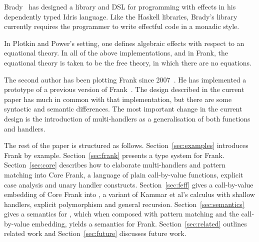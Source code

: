 Brady~\cite{Brady13} has designed a library and DSL for programming
with effects in his dependently typed Idris language. Like the Haskell
libraries, Brady's library currently requires the programmer to write
effectful code in a monadic style.

In Plotkin and Power’s setting, one defines algebraic effects with
respect to an equational theory. In all of the above implementations,
and in Frank, the equational theory is taken to be the free theory, in
which there are no equations.
%

The second author has been plotting Frank since
2007~\cite{McBride07}. He has implemented a prototype of a previous
version of Frank~\cite{McBride12}. The design described in the current
paper has much in common with that implementation, but there are some
syntactic and semantic differences. The most important change in the
current design is the introduction of multi-handlers as a
generalisation of both functions and handlers.

The rest of the paper is structured as follows.
%
Section~\ref{sec:examples} introduces Frank by
example. Section~\ref{sec:frank} presents a type system for
Frank. Section~\ref{sec:core} describes how to elaborate
multi-handlers and pattern matching into Core Frank, a language of
plain call-by-value functions, explicit case analysis and unary
handler constructs. Section~\ref{sec:feff} gives a call-by-value
embedding of Core Frank into \feff, a variant of Kammar et al's
\lameff calculus with shallow handlers, explicit polymorphism and
general recursion. Section~\ref{sec:semantics} gives a semantics for
\feff, which when composed with pattern matching and the call-by-value
embedding, yields a semantics for Frank. Section~\ref{sec:related}
outlines related work and Section~\ref{sec:future} discusses future
work.
